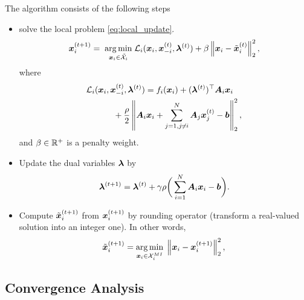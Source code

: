 \documentclass[twocolumn,amsthm]{autart}%
\theoremstyle{definition}
\theoremstyle{plain}
\begin{document}
The algorithm consists of the following steps
\begin{itemize}
\item {} solve the local problem \eqref{eq:local_update}.
\begin{equation}
\label{eq:local_update}
\boldsymbol{x}_i^{(t+1)} = \; \underset{\boldsymbol{x}_i \in \tilde{\mathcal{X}}_i}{\operatorname*{arg\,min}}  \; \mathcal{L}_i (\boldsymbol{x}_i, \boldsymbol{x}_{-i}^{(t)}, \boldsymbol{\lambda}^{(t)}) + \beta \left\lVert \boldsymbol{x}_i - \tilde{\boldsymbol{x}}_i^{(t)} \right\rVert_2^2,
\end{equation}
where 
\begin{equation}
\begin{multlined}
\LLL_i (\bbsym{x}_i, \bbsym{x}_{-i}^{(t)}, \bbsym{\lambda}^{(t)}) = f_i ( \bbsym{x}_i) + (\bbsym{\lambda}^{(t)})^\top \bbsym{A}_{i} \bbsym{x}_i \\
+ \frac{\rho}{2} \norm{\bbsym{A}_{i} \bbsym{x}_i + \sum_{j=1, j\neq i}^N \bbsym{A}_{j} \bbsym{x}_j^{(t)} - \bbsym{b}}_2^2 ,
\end{multlined}
\end{equation}
and $\beta \in \mathbb{R}^{+}$ is a penalty weight.

\item Update the dual variables $\boldsymbol{\lambda}$ by 
\begin{equation}
\boldsymbol{\lambda}^{(t+1)} = \boldsymbol{\lambda}^{(t)} + \gamma \rho \bigg( \sum_{i=1}^{N} \boldsymbol{A}_{i} \boldsymbol{x}_i - \boldsymbol{b} \bigg).
\end{equation}


\item Compute $\tilde{\boldsymbol{x}}_i^{(t+1)}$ from $\boldsymbol{x}_i^{(t+1)}$ by rounding operator (transform a real-valued solution into an integer one). 
In other words,
\begin{equation}
\tilde{\boldsymbol{x}}_i^{(t+1)} = \underset{\boldsymbol{x}_i \in \mathcal{X}_i^{\relax{MI}}}{\operatorname*{arg\,min}} \;
\left\lVert \boldsymbol{x}_i - \boldsymbol{x}_i^{(t+1)} \right\rVert_2^2,
\end{equation}
\end{itemize}




\subsection{Convergence Analysis}
\end{document}
